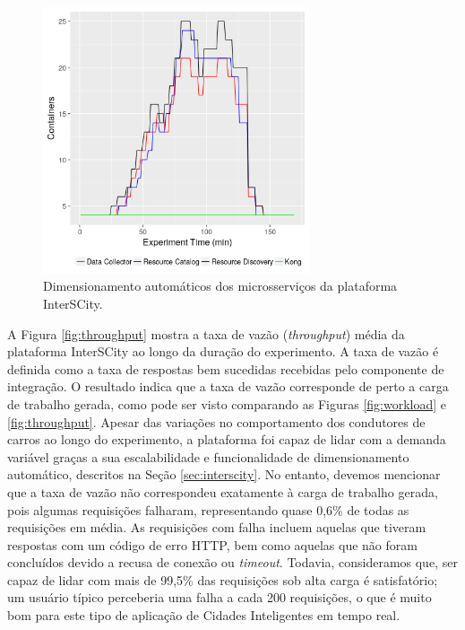 \begin{figure}[ht]
	\centering
	\includegraphics[width=0.7\textwidth]{figuras/auto-scaling.png}
    \caption{Dimensionamento automáticos dos microsserviços da plataforma InterSCity.}
	\label{fig:auto-scaling}
\end{figure}


A Figura \ref{fig:throughput} mostra a taxa de vazão (\textit{throughput}) média da plataforma InterSCity ao longo da duração do experimento.
A taxa de vazão é definida como a taxa de respostas bem sucedidas recebidas pelo componente de integração.
O resultado indica que a taxa de vazão corresponde de perto a carga de trabalho gerada, como pode ser visto comparando as Figuras \ref{fig:workload} e \ref{fig:throughput}.
Apesar das variações no comportamento dos condutores de carros ao longo do experimento, a plataforma foi capaz de lidar com a demanda variável graças a sua escalabilidade e funcionalidade de dimensionamento
automático, descritos na Seção \ref{sec:interscity}.
No entanto, devemos mencionar que a taxa de vazão não correspondeu exatamente à carga de trabalho gerada, pois algumas requisições falharam, representando quase 0,6\% de todas as requisições em média.
As requisições com falha incluem aquelas que tiveram respostas com um código de erro HTTP, bem como aquelas que não foram concluídos devido a recusa de conexão ou \textit{timeout}.
Todavia, consideramos que, ser capaz de lidar com mais de 99,5\% das requisições sob alta carga é satisfatório; um usuário típico perceberia uma falha a cada 200 requisições, o que é muito bom para
este tipo de aplicação de Cidades Inteligentes em tempo real.

